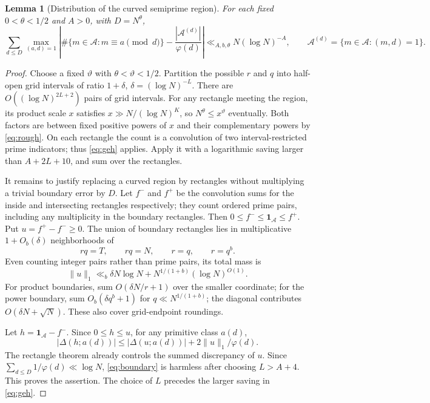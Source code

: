 \documentclass[11pt]{article}
\newtheorem{lemma}[theorem]{Lemma}
\newcommand{\one}{\mathbf 1}
\begin{document}
\begin{lemma}[Distribution of the curved semiprime region]\label{lem:bv}
For each fixed $0<\theta<1/2$ and $A>0$, with $D=N^\theta$,
\[
 \sum_{d\le D}\max_{(a,d)=1}
 \left|\#\{m\in\mathcal A:m\equiv a\pmod d\}
       -\frac{|\mathcal A^{(d)}|}{\varphi(d)}\right|
 \ll_{A,b,\theta}N(\log N)^{-A},
 \qquad
 \mathcal A^{(d)}=\{m\in\mathcal A:(m,d)=1\}.
\]
\end{lemma}
\begin{proof}
Choose a fixed $\vartheta$ with $\theta<\vartheta<1/2$.
Partition the possible $r$ and $q$ into half-open grid intervals of ratio
$1+\delta$, $\delta=(\log N)^{-L}$. There are
$O((\log N)^{2L+2})$ pairs of grid intervals. For any rectangle meeting
the region, its product scale $x$ satisfies
$x\gg N/(\log N)^K$, so $N^\theta\le x^\vartheta$ eventually.
Both factors are between fixed positive powers of $x$ and their
complementary powers by \eqref{eq:rough}. On each rectangle the count
is a convolution of two interval-restricted prime indicators; thus
\eqref{eq:geh} applies. Apply it with a logarithmic saving larger than
$A+2L+10$, and sum over the rectangles.

It remains to justify replacing a curved region by rectangles without
multiplying a trivial boundary error by $D$. Let $f^-$ and $f^+$ be the
convolution sums for the inside and intersecting rectangles respectively;
they count ordered prime pairs, including any multiplicity in the
boundary rectangles. Then $0\le f^-\le\one_{\mathcal A}\le f^+$.
Put $u=f^+-f^-\ge0$. The union of boundary rectangles lies in
multiplicative $1+O_b(\delta)$ neighborhoods of
\[
 rq=T,\qquad rq=N,\qquad r=q,\qquad r=q^b.
\]
Even counting integer pairs rather than prime pairs, its total mass is
\begin{equation}\label{eq:boundary}
 \|u\|_1\ll_b\delta N\log N+N^{1/(1+b)}(\log N)^{O(1)}.
\end{equation}
For product boundaries, sum $O(\delta N/r+1)$ over the smaller
coordinate; for the power boundary, sum $O_b(\delta q^b+1)$ for
$q\ll N^{1/(1+b)}$; the diagonal contributes
$O(\delta N+\sqrt N)$. These also cover grid-endpoint roundings.

Let $h=\one_{\mathcal A}-f^-$. Since $0\le h\le u$, for any primitive
class $a(d)$,
\[
 |\Delta(h;a(d))|\le |\Delta(u;a(d))|+
                  2\|u\|_1/\varphi(d).
\]
The rectangle theorem already controls the summed discrepancy of $u$.
Since $\sum_{d\le D}1/\varphi(d)\ll\log N$, \eqref{eq:boundary}
is harmless after choosing $L>A+4$. This proves the assertion. The
choice of $L$ precedes the larger saving in \eqref{eq:geh}.
\end{proof}
\end{document}
